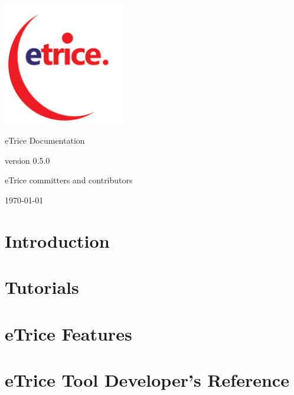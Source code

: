 \documentclass[a4paper,oneside,10pt]{book}
\newcommand{\eTrice}{{\color{blue}e}{\color{red}Trice}{}}
\begin{document}
\begin{titlepage}

\begin{center}

\includegraphics[width=0.4\textwidth]{images/logo/eTRICE-logo.png}

\Huge \eTrice{} Documentation

\Large version 0.5.0

\large \eTrice{} committers and contributors

\vfill

{\large \today}

\end{center}

\end{titlepage}

\tableofcontents

\chapter{Introduction}




\chapter{Tutorials}












\chapter{eTrice Features}






%
%
%



\chapter{eTrice{} Tool Developer's Reference}


\end{document}
